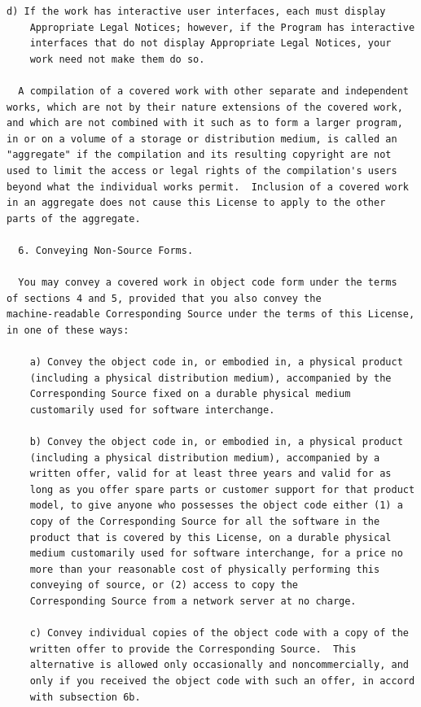 \documentclass[letterpaper,10pt,english]{sphinxmanual}
\begin{document}
\begin{Verbatim}[commandchars=\\\{\}]
    d) If the work has interactive user interfaces, each must display
    Appropriate Legal Notices; however, if the Program has interactive
    interfaces that do not display Appropriate Legal Notices, your
    work need not make them do so.

  A compilation of a covered work with other separate and independent
works, which are not by their nature extensions of the covered work,
and which are not combined with it such as to form a larger program,
in or on a volume of a storage or distribution medium, is called an
"aggregate" if the compilation and its resulting copyright are not
used to limit the access or legal rights of the compilation's users
beyond what the individual works permit.  Inclusion of a covered work
in an aggregate does not cause this License to apply to the other
parts of the aggregate.

  6. Conveying Non-Source Forms.

  You may convey a covered work in object code form under the terms
of sections 4 and 5, provided that you also convey the
machine-readable Corresponding Source under the terms of this License,
in one of these ways:

    a) Convey the object code in, or embodied in, a physical product
    (including a physical distribution medium), accompanied by the
    Corresponding Source fixed on a durable physical medium
    customarily used for software interchange.

    b) Convey the object code in, or embodied in, a physical product
    (including a physical distribution medium), accompanied by a
    written offer, valid for at least three years and valid for as
    long as you offer spare parts or customer support for that product
    model, to give anyone who possesses the object code either (1) a
    copy of the Corresponding Source for all the software in the
    product that is covered by this License, on a durable physical
    medium customarily used for software interchange, for a price no
    more than your reasonable cost of physically performing this
    conveying of source, or (2) access to copy the
    Corresponding Source from a network server at no charge.

    c) Convey individual copies of the object code with a copy of the
    written offer to provide the Corresponding Source.  This
    alternative is allowed only occasionally and noncommercially, and
    only if you received the object code with such an offer, in accord
    with subsection 6b.


\end{Verbatim}
\end{document}
